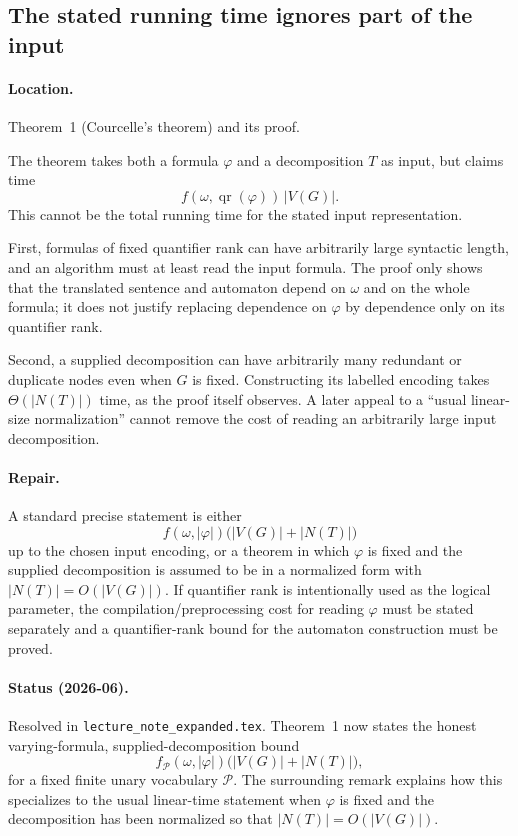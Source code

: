 \documentclass[11pt]{article}
\begin{document}
\subsection{The stated running time ignores part of the input}

\paragraph{Location.} Theorem~1 (Courcelle's theorem) and its proof.

The theorem takes both a formula \(\varphi\) and a decomposition \(T\) as input,
but claims time
\[
  f(\omega,\operatorname{qr}(\varphi))\,|V(G)|.
\]
This cannot be the total running time for the stated input representation.

First, formulas of fixed quantifier rank can have arbitrarily large syntactic
length, and an algorithm must at least read the input formula.  The proof only
shows that the translated sentence and automaton depend on \(\omega\) and on the
whole formula; it does not justify replacing dependence on \(\varphi\) by
dependence only on its quantifier rank.

Second, a supplied decomposition can have arbitrarily many redundant or
duplicate nodes even when \(G\) is fixed.  Constructing its labelled encoding
takes \(\Theta(|N(T)|)\) time, as the proof itself observes.  A later appeal to a
``usual linear-size normalization'' cannot remove the cost of reading an
arbitrarily large input decomposition.

\paragraph{Repair.} A standard precise statement is either
\[
  f(\omega,|\varphi|)\bigl(|V(G)|+|N(T)|\bigr)
\]
up to the chosen input encoding, or a theorem in which \(\varphi\) is fixed and
the supplied decomposition is assumed to be in a normalized form with
\(|N(T)|=O(|V(G)|)\).  If quantifier rank is intentionally used as the logical
parameter, the compilation/preprocessing cost for reading \(\varphi\) must be
stated separately and a quantifier-rank bound for the automaton construction
must be proved.

\paragraph{Status (2026-06).} Resolved in \texttt{lecture\_note\_expanded.tex}.
Theorem~1 now states the honest varying-formula, supplied-decomposition bound
\[
  f_{\mathcal P}(\omega,|\varphi|)\bigl(|V(G)|+|N(T)|\bigr),
\]
for a fixed finite unary vocabulary \(\mathcal P\).  The surrounding remark
explains how this specializes to the usual linear-time statement when
\(\varphi\) is fixed and the decomposition has been normalized so that
\(|N(T)|=O(|V(G)|)\).
\end{document}
